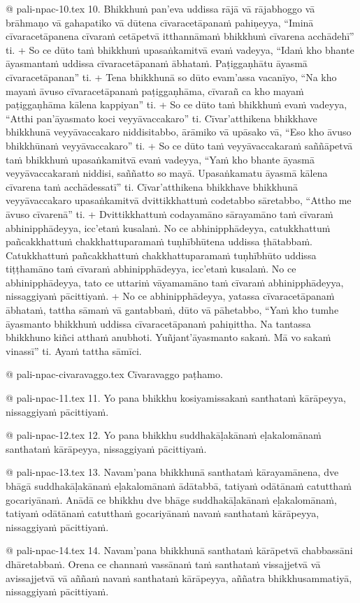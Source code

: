 @ pali-npac-10.tex
10. Bhikkhuṁ pan’eva uddissa rājā vā rājabhoggo vā brāhmaṇo vā gahapatiko vā dūtena cīvaracetāpanaṁ pahiṇeyya, “Iminā cīvaracetāpanena cīvaraṁ cetāpetvā itthannāmaṁ bhikkhuṁ cīvarena acchādehī” ti. +
So ce dūto taṁ bhikkhuṁ upasaṅkamitvā evaṁ vadeyya, “Idaṁ kho bhante āyasmantaṁ uddissa cīvaracetāpanaṁ ābhataṁ. Paṭiggaṇhātu āyasmā cīvaracetāpanan” ti. +
Tena bhikkhunā so dūto evam’assa vacanīyo, “Na kho mayaṁ āvuso cīvaracetāpanaṁ paṭiggaṇhāma, cīvarañ ca kho mayaṁ paṭiggaṇhāma kālena kappiyan” ti. +
So ce dūto taṁ bhikkhuṁ evaṁ vadeyya, “Atthi pan’āyasmato koci veyyāvaccakaro” ti. Cīvar’atthikena bhikkhave bhikkhunā veyyāvaccakaro niddisitabbo, ārāmiko vā upāsako vā, “Eso kho āvuso bhikkhūnaṁ veyyāvaccakaro” ti. +
So ce dūto taṁ veyyāvaccakaraṁ saññāpetvā taṁ bhikkhuṁ upasaṅkamitvā evaṁ vadeyya, “Yaṁ kho bhante āyasmā veyyāvaccakaraṁ niddisi, saññatto so mayā. Upasaṅkamatu āyasmā kālena cīvarena taṁ acchādessatī” ti. Cīvar’atthikena bhikkhave bhikkhunā veyyāvaccakaro upasaṅkamitvā dvittikkhattuṁ codetabbo sāretabbo, “Attho me āvuso cīvarenā” ti. +
Dvittikkhattuṁ codayamāno sārayamāno taṁ cīvaraṁ abhinipphādeyya, icc’etaṁ kusalaṁ. No ce abhinipphādeyya, catukkhattuṁ pañcakkhattuṁ chakkhattuparamaṁ tuṇhībhūtena uddissa ṭhātabbaṁ. Catukkhattuṁ pañcakkhattuṁ chakkhattuparamaṁ tuṇhībhūto uddissa tiṭṭhamāno taṁ cīvaraṁ abhinipphādeyya, icc’etaṁ kusalaṁ. No ce abhinipphādeyya, tato ce uttariṁ vāyamamāno taṁ cīvaraṁ abhinipphādeyya, nissaggiyaṁ pācittiyaṁ. +
No ce abhinipphādeyya, yatassa cīvaracetāpanaṁ ābhataṁ, tattha sāmaṁ vā gantabbaṁ, dūto vā pāhetabbo, “Yaṁ kho tumhe āyasmanto bhikkhuṁ uddissa cīvaracetāpanaṁ pahiṇittha. Na tantassa bhikkhuno kiñci atthaṁ anubhoti. Yuñjant’āyasmanto sakaṁ. Mā vo sakaṁ vinassī” ti. Ayaṁ tattha sāmīci.

@ pali-npac-civaravaggo.tex
Cīvaravaggo paṭhamo.

@ pali-npac-11.tex
11. Yo pana bhikkhu kosiyamissakaṁ santhataṁ kārāpeyya, nissaggiyaṁ pācittiyaṁ.

@ pali-npac-12.tex
12. Yo pana bhikkhu suddhakāḷakānaṁ eḷakalomānaṁ santhataṁ kārāpeyya, nissaggiyaṁ pācittiyaṁ.

@ pali-npac-13.tex
13. Navam’pana bhikkhunā santhataṁ kārayamānena, dve bhāgā suddhakāḷakānaṁ eḷakalomānaṁ ādātabbā, tatiyaṁ odātānaṁ catutthaṁ gocariyānaṁ. Anādā ce bhikkhu dve bhāge suddhakāḷakānaṁ eḷakalomānaṁ, tatiyaṁ odātānaṁ catutthaṁ gocariyānaṁ navaṁ santhataṁ kārāpeyya, nissaggiyaṁ pācittiyaṁ.

@ pali-npac-14.tex
14. Navam’pana bhikkhunā santhataṁ kārāpetvā chabbassāni dhāretabbaṁ. Orena ce channaṁ vassānaṁ taṁ santhataṁ vissajjetvā vā avissajjetvā vā aññaṁ navaṁ santhataṁ kārāpeyya, aññatra bhikkhusammatiyā, nissaggiyaṁ pācittiyaṁ.

